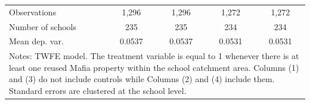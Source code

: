 \documentclass[12pt]{article}
\theoremstyle{plain}
\theoremstyle{plain}
\theoremstyle{plain}
\theoremstyle{definition}
\theoremstyle{plain}
\theoremstyle{definition}
\theoremstyle{plain}
\theoremstyle{remark}
\theoremstyle{definition}
\theoremstyle{definition}
\theoremstyle{plain}
\begin{document}
\begin{table}[H]
{\begin{tabular}{p{10.165em}llll}
			\multicolumn{1}{l}{Observations} & \multicolumn{1}{c}{1,296} & \multicolumn{1}{c}{1,296} & \multicolumn{1}{c}{1,272} & \multicolumn{1}{c}{1,272} \\
			\multicolumn{1}{l}{Number of schools} & \multicolumn{1}{c}{235} & \multicolumn{1}{c}{235} & \multicolumn{1}{c}{234} & \multicolumn{1}{c}{234} \\
			\multicolumn{1}{l}{Mean dep. var.} & \multicolumn{1}{c}{0.0537} & \multicolumn{1}{c}{0.0537} & \multicolumn{1}{c}{0.0531} & \multicolumn{1}{c}{0.0531} \\
			\midrule
			\multicolumn{5}{p{30.165em}}{Notes: TWFE model. The treatment variable is equal to 1 whenever there is at least one reused Mafia property within the school catchment area. Columns (1) and (3) do not include controls while Columns (2) and (4)  include them. Standard errors are clustered at the
				school level.} \\
		\end{tabular}%
	}
\end{table}


\FloatBarrier
\end{document}

